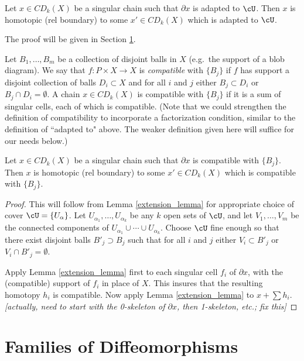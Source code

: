 \documentclass[11pt,leqno]{article}
\def\bd{\partial}
\def\sub{\subset}
\def\sup{\supset}
\def\nn#1{{{\it \small [#1]}}}
\begin{document}
\begin{lemma}  \label{extension_lemma}
Let $x \in CD_k(X)$ be a singular chain such that $\bd x$ is adapted to $\cU$.
Then $x$ is homotopic (rel boundary) to some $x' \in CD_k(X)$ which is adapted to $\cU$.
\end{lemma}

The proof will be given in Section \ref{fam_diff_sect}.

\medskip

Let $B_1, \ldots, B_m$ be a collection of disjoint balls in $X$ 
(e.g.~the support of a blob diagram).
We say that $f:P\times X\to X$ is {\it compatible} with $\{B_j\}$ if
$f$ has support a disjoint collection of balls $D_i \sub X$ and for all $i$ and $j$
either $B_j \sub D_i$ or $B_j \cap D_i = \emptyset$.
A chain $x \in CD_k(X)$ is compatible with $\{B_j\}$ if it is a sum of singular cells, 
each of which is compatible.
(Note that we could strengthen the definition of compatibility to incorporate
a factorization condition, similar to the definition of ``adapted to" above.
The weaker definition given here will suffice for our needs below.)

\begin{cor}  \label{extension_lemma_2}
Let $x \in CD_k(X)$ be a singular chain such that $\bd x$ is compatible with $\{B_j\}$.
Then $x$ is homotopic (rel boundary) to some $x' \in CD_k(X)$ which is compatible with $\{B_j\}$.
\end{cor}
\begin{proof}
This will follow from Lemma \ref{extension_lemma} for 
appropriate choice of cover $\cU = \{U_\alpha\}$.
Let $U_{\alpha_1}, \ldots, U_{\alpha_k}$ be any $k$ open sets of $\cU$, and let
$V_1, \ldots, V_m$ be the connected components of $U_{\alpha_1}\cup\cdots\cup U_{\alpha_k}$.
Choose $\cU$ fine enough so that there exist disjoint balls $B'_j \sup B_j$ such that for all $i$ and $j$
either $V_i \sub B'_j$ or $V_i \cap B'_j = \emptyset$.

Apply Lemma \ref{extension_lemma} first to each singular cell $f_i$ of $\bd x$, 
with the (compatible) support of $f_i$ in place of $X$.
This insures that the resulting homotopy $h_i$ is compatible.
Now apply Lemma \ref{extension_lemma} to $x + \sum h_i$.
\nn{actually, need to start with the 0-skeleton of $\bd x$, then 1-skeleton, etc.; fix this}
\end{proof}




\section{Families of Diffeomorphisms}  \label{fam_diff_sect}
\end{document}
